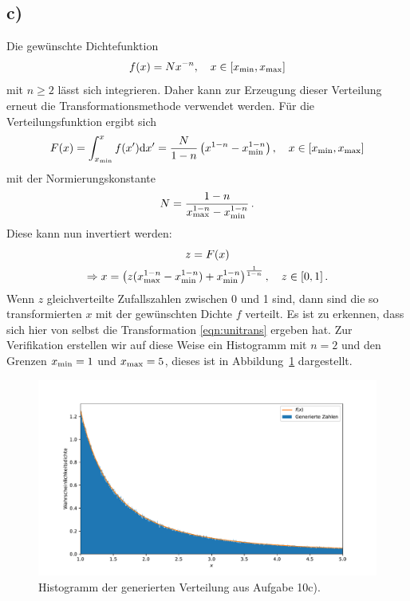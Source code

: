 \documentclass[a4paper, 11pt]{article}
\begin{document}
\subsection*{c)}
Die gewünschte Dichtefunktion 
\begin{equation}
    f(x) = Nx^{-n},\quad x \in [x_{\textup{min}}, x_\textup{max}]
\end{equation}
mit $n\geq2$ lässt sich integrieren. Daher kann zur Erzeugung dieser Verteilung erneut die Transformationsmethode verwendet werden. Für die Verteilungsfunktion ergibt sich\begin{equation}
    F(x) = \int_{x_\textup{min}}^{x} f(x') \textup{d}x' = \frac{N}{1 - n}\left(x^{1 - n} - x_\textup{min}^{1 -n}\right), \quad x \in [x_\textup{min}, x_\textup{max}]
\end{equation}
mit der Normierungskonstante 
\begin{equation}
    N = \frac{1 - n}{x_\textup{max}^{1- n} - x_\textup{min}^{1 - n}}\,.
\end{equation}
Diese kann nun invertiert werden:
\begin{gather}
    z = F(x) \\
    \Rightarrow x = \left(z(x_\textup{max}^{1-n} - x_\textup{min}^{1-n}) + x_\textup{min}^{1-n}\right)^{\frac{1}{1-n}}, \quad z \in [0,  1]\,.
\end{gather}
Wenn $z$ gleichverteilte Zufallszahlen zwischen 0 und 1 sind, dann sind die so transformierten $x$ mit der gewünschten Dichte $f$ verteilt. Es ist zu erkennen, dass sich hier von selbst die Transformation \eqref{eqn:unitrans} ergeben hat. Zur Verifikation erstellen wir auf diese Weise ein Histogramm mit $n = 2$ und den Grenzen $x_\textup{min} = 1$ und $x_\textup{max} = 5$, dieses ist in Abbildung~\ref{fig:a10c} dargestellt. 
\begin{figure}
    \centering
    \includegraphics[width=\textwidth]{../A10/A10c.pdf}
    \caption{Histogramm der generierten Verteilung aus Aufgabe 10c).}
    \label{fig:a10c}
\end{figure}
\FloatBarrier
\end{document}
